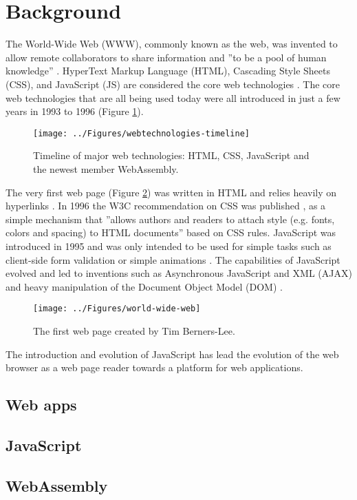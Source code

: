 \section{Background}
\label{background}

The World-Wide Web (WWW), commonly known as the web, was invented to allow remote collaborators to share information and ''to be a pool of human knowledge'' \parencite[76]{BernersLeeCailliauLuotonenNielsenSecret1994}. HyperText Markup Language (HTML), Cascading Style Sheets (CSS), and JavaScript (JS) are considered the core web technologies \parencite{MajchrzakBiornHansenGronli2018}. The core web technologies that are all being used today were all introduced in just a few years in 1993 to 1996 (Figure \ref{webtechnologies-timeline}).

\begin{figure}[!h]
\centering
\texttt{[image: ../Figures/webtechnologies-timeline]}
\caption{Timeline of major web technologies: HTML, CSS, JavaScript and the newest member WebAssembly.}
\label{webtechnologies-timeline}
\end{figure}

The very first web page (Figure \ref{world-wide-web}) was written in HTML and relies heavily on hyperlinks \parencite{BernersLeeCailliauGroffPollermann1992}. In 1996 the W3C recommendation on CSS was published \parencite{LieBos1996}, as a simple mechanism that ''allows authors and readers to attach style (e.g. fonts, colors and spacing) to HTML documents'' \parencite*[1]{LieBos1996} based on CSS rules. JavaScript was introduced in 1995 and was only intended to be used for simple tasks such as client-side form validation or simple animations \parencite{Moller2018}. The capabilities of JavaScript evolved and led to inventions such as Asynchronous JavaScript and XML (AJAX) \parencite{NielsonWilliamsonArlitt2008} and heavy manipulation of the Document Object Model (DOM) \parencite{WoodLeHorsApparaoByrneChampionIsaacsJacobsNicolRobieSutor1998}.

\begin{figure}[!h]
\centering
\texttt{[image: ../Figures/world-wide-web]}
\caption{The first web page created by Tim Berners-Lee.}
\label{world-wide-web}
\end{figure}

The introduction and evolution of JavaScript has lead the evolution of the web browser as a web page reader towards a platform for web applications.

\subsection{Web apps}


\subsection{JavaScript}


\subsection{WebAssembly}


